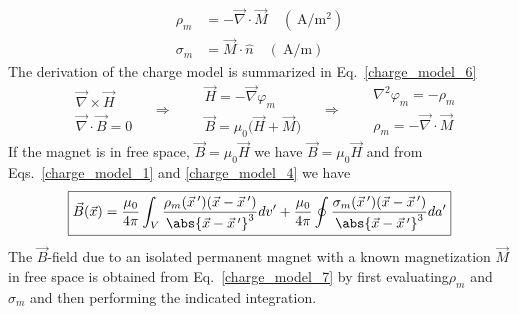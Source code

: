 \documentclass[12pt,a4paper,oneside]{book}
\begin{document}
\begin{onehalfspace}
\begin{equation}\label{charge_model_5}
	\boxed{\begin{aligned}
			\rho_m &= -\vec{\nabla}\cdot\vec{M}\quad(\SI{}{\ampere\per\square\meter}) \\[6pt]
			\sigma_m &= \vec{M}\cdot\hat{n}\quad(\SI{}{\ampere\per\meter})
	\end{aligned}}
\end{equation}
The derivation of the charge model is summarized in Eq.~\eqref{charge_model_6}
\begin{equation}\label{charge_model_6}
\boxed{\begin{aligned}
	&\vec{\nabla}\times\vec{H} \\[6pt]
	&\vec{\nabla}\cdot\vec{B}=0
\end{aligned}}\quad\Rightarrow\quad
\boxed{\begin{aligned}
		&\vec{H}=-\vec{\nabla}\varphi_m \\[6pt]
		&\vec{B}=\mu_0\Big(\vec{H}+\vec{M}\Big)
\end{aligned}}\quad\Rightarrow\quad
\boxed{\begin{aligned}
		&\nabla^2\varphi_m=-\rho_m \\[6pt]
		&\rho_m=-\vec{\nabla}\cdot\vec{M}
\end{aligned}}
\end{equation}
If the magnet is in free space, $\vec{B}=\mu_0\vec{H}$ we have $\vec{B}=\mu_0\vec{H}$ and from Eqs.~\eqref{charge_model_1} and \ref{charge_model_4} we have
\begin{equation}\label{charge_model_7}
	\boxed{\begin{aligned}
		\vec{B}(\vec{x}) = \frac{\mu_0}{4\pi}\int_{V}\frac{\rho_m(\vec{x}\,')(\vec{x}-\vec{x}\,')}{\abs{\vec{x}-\vec{x}\,'}^3}dv'+\frac{\mu_0}{4\pi}\oint\frac{\sigma_m(\vec{x}\,')(\vec{x}-\vec{x}\,')}{\abs{\vec{x}-\vec{x}\,'}^3}da'
	\end{aligned}}
\end{equation}
The $\vec{B}$-field due to an isolated permanent magnet with a known magnetization $\vec{M}$ in free space is obtained from Eq.~\eqref{charge_model_7} by first evaluating$\rho_m$ and $\sigma_m$ and then performing the indicated integration.


\end{onehalfspace}
\end{document}
